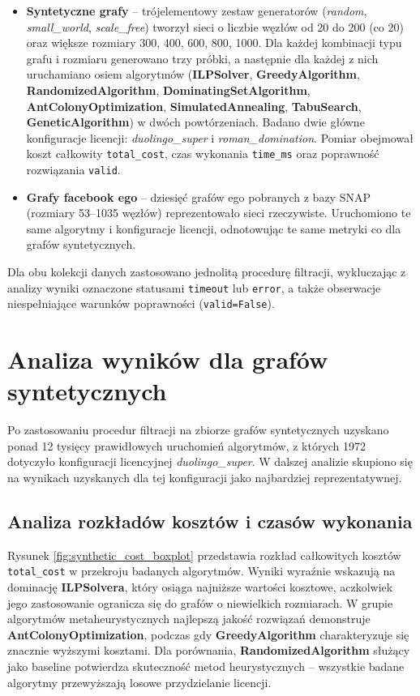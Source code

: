 \begin{itemize}
\item \textbf{Syntetyczne grafy} -- trójelementowy zestaw generatorów (\emph{random}, \emph{small\_world}, \emph{scale\_free}) tworzył sieci o liczbie węzłów od 20 do 200 (co 20) oraz większe rozmiary 300, 400, 600, 800, 1000. Dla każdej kombinacji typu grafu i rozmiaru generowano trzy próbki, a następnie dla każdej z nich uruchamiano osiem algorytmów (\textbf{ILPSolver}, \textbf{GreedyAlgorithm}, \textbf{RandomizedAlgorithm}, \textbf{DominatingSetAlgorithm}, \textbf{AntColonyOptimization}, \textbf{SimulatedAnnealing}, \textbf{TabuSearch}, \textbf{GeneticAlgorithm}) w dwóch powtórzeniach. Badano dwie główne konfiguracje licencji: \emph{duolingo\_super} i \emph{roman\_domination}. Pomiar obejmował koszt całkowity \texttt{total\_cost}, czas wykonania \texttt{time\_ms} oraz poprawność rozwiązania \texttt{valid}.

\item \textbf{Grafy facebook ego} -- dziesięć grafów ego pobranych z bazy SNAP (rozmiary 53--1035 węzłów) reprezentowało sieci rzeczywiste. Uruchomiono te same algorytmy i konfiguracje licencji, odnotowując te same metryki co dla grafów syntetycznych.
\end{itemize}

Dla obu kolekcji danych zastosowano jednolitą procedurę filtracji, wykluczając z analizy wyniki oznaczone statusami \texttt{timeout} lub \texttt{error}, a także obserwacje niespełniające warunków poprawności (\texttt{valid=False}).

\section{Analiza wyników dla grafów syntetycznych}

Po zastosowaniu procedur filtracji na zbiorze grafów syntetycznych uzyskano ponad 12 tysięcy prawidłowych uruchomień algorytmów, z których 1972 dotyczyło konfiguracji licencyjnej \emph{duolingo\_super}. W dalszej analizie skupiono się na wynikach uzyskanych dla tej konfiguracji jako najbardziej reprezentatywnej.

\subsection{Analiza rozkładów kosztów i czasów wykonania}

Rysunek \ref{fig:synthetic_cost_boxplot} przedstawia rozkład całkowitych kosztów \texttt{total\_cost} w przekroju badanych algorytmów. Wyniki wyraźnie wskazują na dominację \textbf{ILPSolvera}, który osiąga najniższe wartości kosztowe, aczkolwiek jego zastosowanie ogranicza się do grafów o niewielkich rozmiarach. W grupie algorytmów metaheurystycznych najlepszą jakość rozwiązań demonstruje \textbf{AntColonyOptimization}, podczas gdy \textbf{GreedyAlgorithm} charakteryzuje się znacznie wyższymi kosztami. Dla porównania, \textbf{RandomizedAlgorithm} służący jako baseline potwierdza skuteczność metod heurystycznych -- wszystkie badane algorytmy przewyższają losowe przydzielanie licencji.

